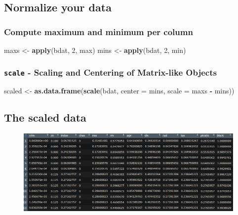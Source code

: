 \documentclass[10pt,]{article}
\newenvironment{Shaded}{\begin{snugshade}}{\end{snugshade}}
\newcommand{\KeywordTok}[1]{\textcolor[rgb]{0.13,0.29,0.53}{\textbf{#1}}}
\newcommand{\DataTypeTok}[1]{\textcolor[rgb]{0.13,0.29,0.53}{#1}}
\newcommand{\DecValTok}[1]{\textcolor[rgb]{0.00,0.00,0.81}{#1}}
\newcommand{\StringTok}[1]{\textcolor[rgb]{0.31,0.60,0.02}{#1}}
\newcommand{\OperatorTok}[1]{\textcolor[rgb]{0.81,0.36,0.00}{\textbf{#1}}}
\newcommand{\NormalTok}[1]{#1}
\begin{document}
\subsection{Normalize your data}\label{normalize-your-data}

\subsubsection{Compute maximum and minimum per
column}\label{compute-maximum-and-minimum-per-column}

\begin{Shaded}
\begin{Highlighting}[]
\NormalTok{maxs <-}\StringTok{ }\KeywordTok{apply}\NormalTok{(bdat, }\DecValTok{2}\NormalTok{, max) }
\NormalTok{mins <-}\StringTok{ }\KeywordTok{apply}\NormalTok{(bdat, }\DecValTok{2}\NormalTok{, min)}
\end{Highlighting}
\end{Shaded}

\subsubsection{\texorpdfstring{\texttt{scale} - Scaling and Centering of
Matrix-like
Objects}{scale - Scaling and Centering of Matrix-like Objects}}\label{scale---scaling-and-centering-of-matrix-like-objects}

\begin{Shaded}
\begin{Highlighting}[]
\NormalTok{scaled <-}\StringTok{ }\KeywordTok{as.data.frame}\NormalTok{(}\KeywordTok{scale}\NormalTok{(bdat, }\DataTypeTok{center =}\NormalTok{ mins, }
                              \DataTypeTok{scale =}\NormalTok{ maxs }\OperatorTok{-}\StringTok{ }\NormalTok{mins))}
\end{Highlighting}
\end{Shaded}

\subsection{The scaled data}\label{the-scaled-data}

\begin{figure}
\centering
\includegraphics{figure/bostonscaled.PNG}
\caption{}
\end{figure}
\end{document}
